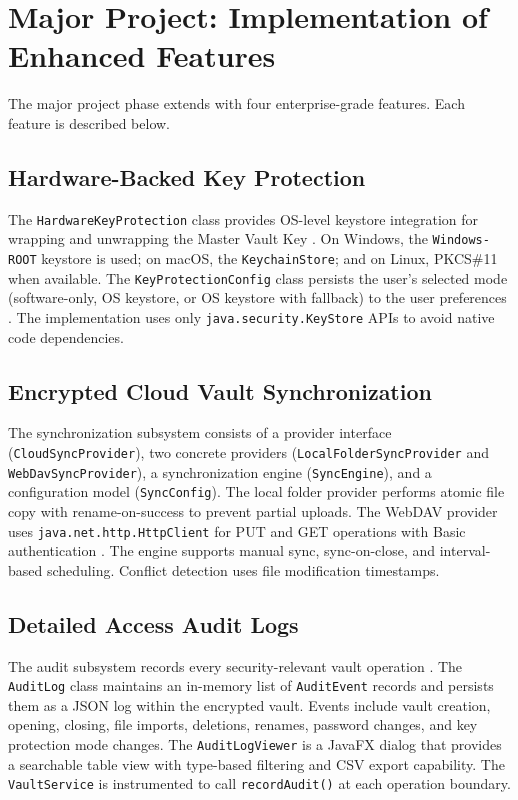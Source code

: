 \section{Major Project: Implementation of Enhanced Features}
The major project phase extends \projname{} with four enterprise-grade features. Each feature is described below.

\subsection{Hardware-Backed Key Protection}
The \texttt{HardwareKeyProtection} class provides OS-level keystore integration for wrapping and unwrapping the Master Vault Key \cite{nist_hsm, java_keystore}. On Windows, the \texttt{Windows-ROOT} keystore is used; on macOS, the \texttt{KeychainStore}; and on Linux, PKCS\#11 when available. The \texttt{KeyProtectionConfig} class persists the user's selected mode (software-only, OS keystore, or OS keystore with fallback) to the user preferences \cite{tpm_security}. The implementation uses only \texttt{java.security.KeyStore} APIs to avoid native code dependencies.

\subsection{Encrypted Cloud Vault Synchronization}
The synchronization subsystem consists of a provider interface (\texttt{CloudSyncProvider}), two concrete providers (\texttt{LocalFolderSyncProvider} and \texttt{WebDavSyncProvider}), a synchronization engine (\texttt{SyncEngine}), and a configuration model (\texttt{SyncConfig}). The local folder provider performs atomic file copy with rename-on-success to prevent partial uploads. The WebDAV provider uses \texttt{java.net.http.HttpClient} for PUT and GET operations with Basic authentication \cite{webdav_rfc, cloud_storage_security}. The engine supports manual sync, sync-on-close, and interval-based scheduling. Conflict detection uses file modification timestamps.

\subsection{Detailed Access Audit Logs}
The audit subsystem records every security-relevant vault operation \cite{nist_audit}. The \texttt{AuditLog} class maintains an in-memory list of \texttt{AuditEvent} records and persists them as a JSON log within the encrypted vault. Events include vault creation, opening, closing, file imports, deletions, renames, password changes, and key protection mode changes. The \texttt{AuditLogViewer} is a JavaFX dialog that provides a searchable table view with type-based filtering and CSV export capability. The \texttt{VaultService} is instrumented to call \texttt{recordAudit()} at each operation boundary.

